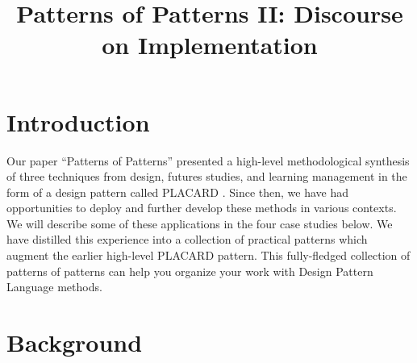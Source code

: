 \documentclass[acmlarge,timestamp]{acmart}
\date{}
\title{Patterns of Patterns II: Discourse on Implementation}
\begin{document}



\section{Introduction}
\label{sec:org195e8e3}
\label{Introduction}


Our paper “Patterns of Patterns” presented a high-level methodological
synthesis of three techniques from design, futures studies, and
learning management in the form of a design pattern called PLACARD
\cite{patterns-of-patterns-i}.  Since then, we have had opportunities
to deploy and further develop these methods in various contexts.  We
will describe some of these applications in the four case studies
below.  We have distilled this experience into a collection of
practical patterns which augment the earlier high-level PLACARD
pattern.  This fully-fledged collection of patterns of patterns can
help you organize your work with Design Pattern Language methods.



\section{Background}
\end{document}
